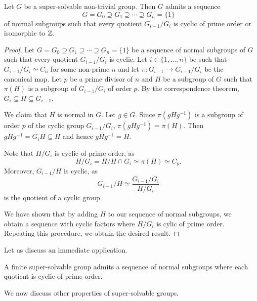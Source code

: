 \begin{theorem}
\label{thm:ZorCp}
Let $G$ be a super-solvable non-trivial group. Then $G$ admits a sequence 
\[
G=G_0\supseteq G_1\supseteq\cdots\supseteq G_n=\{1\}
\]
of normal subgroups 
such that every quotient $G_{i-1}/G_i$ is cyclic of prime order or isomorphic to 
$\mathbb{Z}$.
\end{theorem}

\begin{proof}
Let $G=G_0\supseteq G_1\supseteq\cdots\supseteq G_n=\{1\}$ be a sequence of normal subgroups
of $G$ such that every quotient $G_{i-1}/G_i$ is cyclic. Let 
$i\in\{1,\dots,n\}$ be such that $G_{i-1}/G_i\simeq C_n$ for some non-prime  
$n$ and let $\pi\colon G_{i-1}\to G_{i-1}/G_i$ be the canonical map. 
Let $p$ be a prime divisor of $n$ and $H$ be a subgroup of $G$ such that 
$\pi(H)$ is a subgroup of $G_{i-1}/G_i$ of order $p$. By the correspondence theorem, 
$G_{i}\subseteq H\subseteq G_{i-1}$. 

We claim that $H$ is normal in $G$. Let $g\in G$. Since $\pi(gHg^{-1})$ is a subgroup of order $p$ of 
the cyclic group $G_{i-1}/G_i$, $\pi(gHg^{-1})=\pi(H)$. Then 
$gHg^{-1}=G_{i}H\subseteq H$ and hence $gHg^{-1}=H$. 

Note that $H/G_i$ is cyclic of prime order, as 
\[
H/G_i=H/H\cap G_i\simeq \pi(H)\simeq C_p. 
\]
Moreover, $G_{i-1}/H$ is cyclic, as 
\[
G_{i-1}/H\simeq\frac{G_{i-1}/G_i}{H/G_i}
\]
is the quotient of a cyclic group. 
	
We have shown that by adding $H$ to our sequence of normal subgroups, 
we obtain a sequence with cyclic factors where 
$H/G_{i}$ is cylic of prime order. Repeating this procedure, we obtain the desired result. 
\end{proof}

Let us discuss an immediate application. 

\begin{corollary}
A finite super-solvable group admits a sequence 
of normal subgroups where each quotient is cyclic of prime order. 
\end{corollary}


We now discuss other properties of super-solvable groups. 

